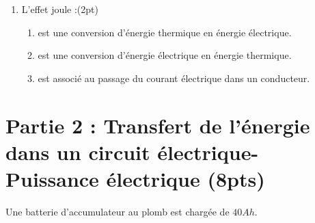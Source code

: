 \documentclass[12pt]{article}
\begin{document}
\begin{multicols}{2}
\begin{enumerate}
    \item  L'effet joule :\dotfill(2pt)
      \begin{enumerate}
          \item  est une conversion d'énergie thermique en énergie électrique.
          \item  est une conversion d'énergie électrique en énergie thermique.
          \item  est associé au passage du courant électrique dans un conducteur.
       \end{enumerate}

\end{enumerate}
\end{multicols}

 \section*{Partie 2 :  Transfert de l’énergie dans un circuit électrique- Puissance électrique \dotfill(8pts)}
Une batterie d’accumulateur au plomb est chargée de $40 Ah$.
\end{document}
